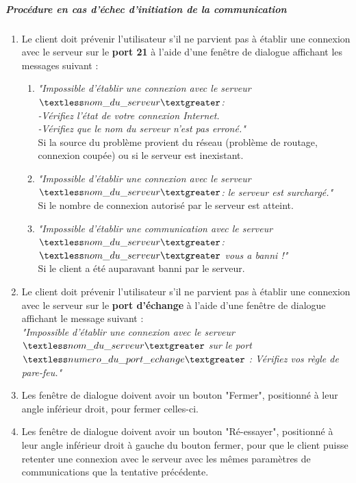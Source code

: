 \documentclass[10pt,a4paper]{report}
\begin{document}
	\subparagraph{Procédure en cas d'échec d'initiation de la communication }

		\begin{enumerate}
			\item Le client doit prévenir l'utilisateur s'il ne parvient pas à établir une connexion avec le serveur sur le \textbf{port 21} à l'aide d'une fenêtre de dialogue affichant les messages suivant : 

			\begin{enumerate}[label=\arabic*.]
				\item \textit{"Impossible d'établir une connexion avec le serveur $\textless nom\_du\_serveur\textgreater$:\\
-Vérifiez l'état de votre connexion Internet.\\
-Vérifiez que le nom du serveur n'est pas erroné."\\}
Si la source du problème provient du réseau (problème de routage, connexion coupée) ou si le serveur est inexistant.

				\item \textit{"Impossible d'établir une connexion avec le serveur $\textless nom\_du\_serveur\textgreater$: le serveur est surchargé."\\}
Si le nombre de connexion autorisé par le serveur est atteint.

				\item \textit{"Impossible d'établir une communication avec le serveur $\textless nom\_du\_serveur\textgreater$:\\
$\textless nom\_du\_serveur\textgreater$ vous a banni !"\\}
Si le client a été auparavant banni par le serveur. 
			\end{enumerate}

			\item Le client doit prévenir l'utilisateur s'il ne parvient pas à établir une connexion avec le serveur sur le \textbf{port d'échange} à l'aide d'une fenêtre de dialogue affichant le message suivant : \\
\textit{"Impossible d'établir une connexion avec le serveur $\textless nom\_du\_serveur\textgreater$ sur le port $\textless numero\_du\_port\_echange\textgreater$ : Vérifiez vos règle de pare-feu."\\}

			\item Les fenêtre de dialogue doivent avoir un bouton "Fermer", positionné à leur angle inférieur droit, pour fermer celles-ci.

			\item Les fenêtre de dialogue doivent avoir un bouton "Ré-essayer", positionné à leur angle inférieur droit à gauche du bouton fermer, pour que le client puisse retenter une connexion avec le serveur avec les mêmes paramètres de communications que la tentative précédente.

		\end{enumerate}
		
\end{document}
